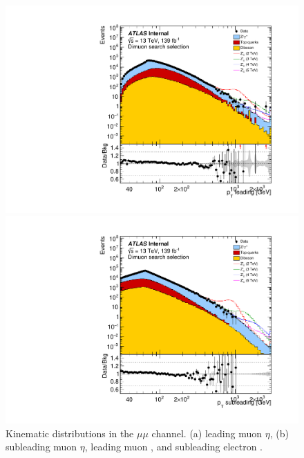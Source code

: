 \begin{figure}[h!]
\begin{minipage}[b]{.45\linewidth}
    \includegraphics[width=1\textwidth]{figures/ci/dataMc/stacks_mc16e_2015-2018_uu_pt1_log100.pdf}
    \subcaption{}
\end{minipage}
\begin{minipage}[b]{.45\linewidth}
    \includegraphics[width=1\textwidth]{figures/ci/dataMc/stacks_mc16e_2015-2018_uu_pt2_log100.pdf}
    \subcaption{}
\end{minipage}
\caption{Kinematic distributions in the $\mu\mu$ channel. (a) leading muon $\eta$, (b) subleading muon $\eta$, leading muon \pt, and subleading electron \pt.}
\label{fig:}
\end{figure}


\clearpage  
